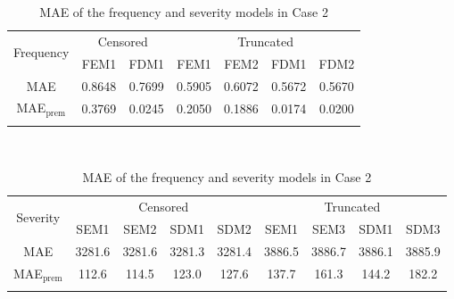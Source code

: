 \documentclass[11pt]{article}
\begin{document}
\begin{table}[!h]
\renewcommand{\tabcolsep}{0.8mm}
\renewcommand{\arraystretch}{1}
\footnotesize
\centering
{\color{blue}
\begin{tabular}[h]{ccccccc}
\toprule
\multirow{2}{*}{Frequency} & \multicolumn{2}{c}{Censored} & \multicolumn{4}{c}{Truncated}\\
\cmidrule(l{3pt}r{3pt}){2-3} \cmidrule(l{3pt}r{3pt}){4-7}
 & FEM1 & FDM1 & FEM1 & FEM2 & FDM1 & FDM2\\
\midrule
MAE & 0.8648 & 0.7699 & 0.5905 & 0.6072 & 0.5672 & 0.5670 \\
MAE$_{\text{prem}}$ & 0.3769 & 0.0245 & 0.2050 & 0.1886 & 0.0174 & 0.0200 \\
\hhline{=======}
\end{tabular}
\\
\vspace{0.3cm}
\begin{tabular}[h]{ccccccccc}
\toprule
\multirow{2}{*}{Severity} & \multicolumn{4}{c}{Censored} & \multicolumn{4}{c}{Truncated}\\
\cmidrule(l{3pt}r{3pt}){2-5} \cmidrule(l{3pt}r{3pt}){6-9}
 & SEM1 & SEM2 & SDM1 & SDM2 & SEM1 & SEM3 & SDM1 & SDM3\\
\midrule
MAE & 3281.6 & 3281.6 & 3281.3 & 3281.4 & 3886.5 & 3886.7 & 3886.1 & 3885.9 \\
MAE$_{\text{prem}}$ & 112.6 & 114.5 & 123.0 & 127.6 & 137.7 & 161.3 & 144.2 & 182.2 \\
\hhline{=========}
\end{tabular}
}
\caption{MAE of the frequency and severity models in Case 2}\label{tab:maecase2}
\end{table}


\FloatBarrier
\end{document}
